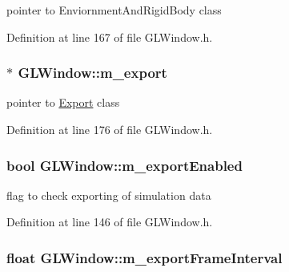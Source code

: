 pointer to EnviornmentAndRigidBody class 



Definition at line 167 of file GLWindow.h.

\hypertarget{class_g_l_window_aa8a9e9361c985761d51de5af16b24981}{
\subsubsection[{m\_\-export}]{$\ast$ {\bf GLWindow::m\_\-export}}}
\label{class_g_l_window_aa8a9e9361c985761d51de5af16b24981}


pointer to \hyperlink{class_export}{Export} class 



Definition at line 176 of file GLWindow.h.

\hypertarget{class_g_l_window_a0919598c4a7cd0726423a0751ef9b193}{
\subsubsection[{m\_\-exportEnabled}]{\setlength{\rightskip}{0pt plus 5cm}bool {\bf GLWindow::m\_\-exportEnabled}}}
\label{class_g_l_window_a0919598c4a7cd0726423a0751ef9b193}


flag to check exporting of simulation data 



Definition at line 146 of file GLWindow.h.

\hypertarget{class_g_l_window_a0d249b475e8b0bc7e7daaf070d1f473c}{
\subsubsection[{m\_\-exportFrameInterval}]{\setlength{\rightskip}{0pt plus 5cm}float {\bf GLWindow::m\_\-exportFrameInterval}}}
\label{class_g_l_window_a0d249b475e8b0bc7e7daaf070d1f473c}


